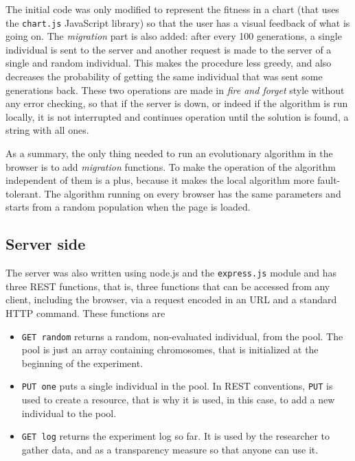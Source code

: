 \documentclass{sig-alternate}
\begin{document}
The initial code was only modified to represent the fitness in a chart
(that uses the {\tt chart.js} JavaScript library) so that the user has
a visual feedback of what is going on. The {\em migration} part is
also added: after every 100 generations, a single individual is sent
to the server and another request is made to the server of a single
and random individual. This makes the procedure less greedy, and also
decreases the probability of getting the same individual that was sent
some generations back. These two operations are made in {\em fire and
  forget} style without any error checking, so that if the server is
down, or indeed if the algorithm is run locally, it is not interrupted
and continues operation until the solution is found, a string with all
ones.  

As a summary, the only thing needed to run an evolutionary algorithm
in the browser is to add {\em migration} functions. To make the
operation of the algorithm independent of them is a plus, because it
makes the local algorithm more fault-tolerant. The algorithm running
on every browser has the same parameters and starts from a random
population when the page is loaded.

\subsection{Server side}
\label{ss:server} 

The server was also written using node.js and the {\tt express.js}
module and has three REST \cite{DBLP:journals/corr/abs-1105-4971}
functions, that is, three functions that can be accessed from any
client, including the browser, via a request encoded in an URL and a
standard HTTP command. These functions are\begin{itemize}
\item {\tt GET random} returns a random, non-evaluated individual,
  from the pool. The pool is just an array containing chromosomes,
  that is initialized at the beginning of the experiment.
\item {\tt PUT one} puts a single individual in the pool. In REST
  conventions, {\tt PUT} is used to create a resource, that is why it
  is used, in this case, to add a new individual to the pool.
\item {\tt GET log} returns the experiment log so far. It is used by
  the researcher to gather data, and as a transparency measure so that
  anyone can use it. 
\end{itemize}
\end{document}
